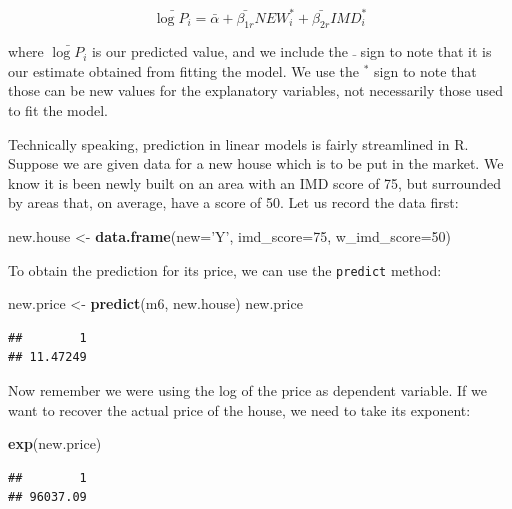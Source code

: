 \documentclass[]{book}
\newenvironment{Shaded}{\begin{snugshade}}{\end{snugshade}}
\newcommand{\KeywordTok}[1]{\textcolor[rgb]{0.13,0.29,0.53}{\textbf{#1}}}
\newcommand{\DataTypeTok}[1]{\textcolor[rgb]{0.13,0.29,0.53}{#1}}
\newcommand{\DecValTok}[1]{\textcolor[rgb]{0.00,0.00,0.81}{#1}}
\newcommand{\StringTok}[1]{\textcolor[rgb]{0.31,0.60,0.02}{#1}}
\newcommand{\NormalTok}[1]{#1}
\begin{document}
\[
\bar{\log{P_i}} = \bar{\alpha} + \bar{\beta_{1r}} NEW_i^* + \bar{\beta_{2r}} IMD_i^*
\]

where \(\bar{\log{P_i}}\) is our predicted value, and we include the
\(\bar{}\) sign to note that it is our estimate obtained from fitting
the model. We use the \(^*\) sign to note that those can be new values
for the explanatory variables, not necessarily those used to fit the
model.

Technically speaking, prediction in linear models is fairly streamlined
in R. Suppose we are given data for a new house which is to be put in
the market. We know it is been newly built on an area with an IMD score
of 75, but surrounded by areas that, on average, have a score of 50. Let
us record the data first:

\begin{Shaded}
\begin{Highlighting}[]
\NormalTok{new.house <-}\StringTok{ }\KeywordTok{data.frame}\NormalTok{(}\DataTypeTok{new=}\StringTok{'Y'}\NormalTok{, }\DataTypeTok{imd_score=}\DecValTok{75}\NormalTok{, }\DataTypeTok{w_imd_score=}\DecValTok{50}\NormalTok{)}
\end{Highlighting}
\end{Shaded}

To obtain the prediction for its price, we can use the \texttt{predict}
method:

\begin{Shaded}
\begin{Highlighting}[]
\NormalTok{new.price <-}\StringTok{ }\KeywordTok{predict}\NormalTok{(m6, new.house)}
\NormalTok{new.price}
\end{Highlighting}
\end{Shaded}

\begin{verbatim}
##        1 
## 11.47249
\end{verbatim}

Now remember we were using the log of the price as dependent variable.
If we want to recover the actual price of the house, we need to take its
exponent:

\begin{Shaded}
\begin{Highlighting}[]
\KeywordTok{exp}\NormalTok{(new.price)}
\end{Highlighting}
\end{Shaded}

\begin{verbatim}
##        1 
## 96037.09
\end{verbatim}
\end{document}
